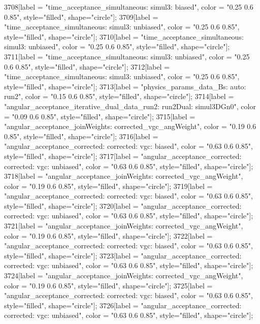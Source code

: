 {	3708[label = "time_acceptance_simultaneous\ntimeacc: simul3\ntrigger: biased", color = "0.25 0.6 0.85", style="filled", shape="circle"];
	3709[label = "time_acceptance_simultaneous\ntimeacc: simul3\ntrigger: unbiased", color = "0.25 0.6 0.85", style="filled", shape="circle"];
	3710[label = "time_acceptance_simultaneous\ntimeacc: simul3\ntrigger: unbiased", color = "0.25 0.6 0.85", style="filled", shape="circle"];
	3711[label = "time_acceptance_simultaneous\ntimeacc: simul3\ntrigger: unbiased", color = "0.25 0.6 0.85", style="filled", shape="circle"];
	3712[label = "time_acceptance_simultaneous\ntimeacc: simul3\ntrigger: unbiased", color = "0.25 0.6 0.85", style="filled", shape="circle"];
	3713[label = "physics_params_data_Bs\nfit: auto\nyear: run2", color = "0.15 0.6 0.85", style="filled", shape="circle"];
	3714[label = "angular_acceptance_iterative_dual_data_run2\nangacc: run2Dual\ntimeacc: simul3DGn0", color = "0.09 0.6 0.85", style="filled", shape="circle"];
	3715[label = "angular_acceptance_joinWeights\nwflag: corrected_vgc_angWeight", color = "0.19 0.6 0.85", style="filled", shape="circle"];
	3716[label = "angular_acceptance_corrected\nangacc: corrected\ncsp: vgc\ntrigger: biased", color = "0.63 0.6 0.85", style="filled", shape="circle"];
	3717[label = "angular_acceptance_corrected\nangacc: corrected\ncsp: vgc\ntrigger: unbiased", color = "0.63 0.6 0.85", style="filled", shape="circle"];
	3718[label = "angular_acceptance_joinWeights\nwflag: corrected_vgc_angWeight", color = "0.19 0.6 0.85", style="filled", shape="circle"];
	3719[label = "angular_acceptance_corrected\nangacc: corrected\ncsp: vgc\ntrigger: biased", color = "0.63 0.6 0.85", style="filled", shape="circle"];
	3720[label = "angular_acceptance_corrected\nangacc: corrected\ncsp: vgc\ntrigger: unbiased", color = "0.63 0.6 0.85", style="filled", shape="circle"];
	3721[label = "angular_acceptance_joinWeights\nwflag: corrected_vgc_angWeight", color = "0.19 0.6 0.85", style="filled", shape="circle"];
	3722[label = "angular_acceptance_corrected\nangacc: corrected\ncsp: vgc\ntrigger: biased", color = "0.63 0.6 0.85", style="filled", shape="circle"];
	3723[label = "angular_acceptance_corrected\nangacc: corrected\ncsp: vgc\ntrigger: unbiased", color = "0.63 0.6 0.85", style="filled", shape="circle"];
	3724[label = "angular_acceptance_joinWeights\nwflag: corrected_vgc_angWeight", color = "0.19 0.6 0.85", style="filled", shape="circle"];
	3725[label = "angular_acceptance_corrected\nangacc: corrected\ncsp: vgc\ntrigger: biased", color = "0.63 0.6 0.85", style="filled", shape="circle"];
	3726[label = "angular_acceptance_corrected\nangacc: corrected\ncsp: vgc\ntrigger: unbiased", color = "0.63 0.6 0.85", style="filled", shape="circle"];
}

